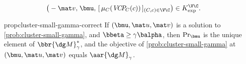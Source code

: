 {\begin{align*}
    \big(-\mat v,\;&\bmu,\, [\,\mu_{C}(\Pash_C(c))\,]_{(C,c)\in\V\C}\big) \in K_{\exp}^{\V\C}
    .
\end{align*}}

\begin{linked}{prop}{cluster-small-gamma-correct}
    If $(\bmu, \mat u, \mat v)$ is a solution to \eqref{prob:cluster-small-gamma},
    and $\bbeta \ge \gamma \balpha$, then
    $\Pr_{\bmu}$ is the unique element of $\bbr{\dg M}^*_\gamma$,
    and the objective of \eqref{prob:cluster-small-gamma} at $(\bmu, \mat u, \mat v)$ equals $\aar{\dg M}_\gamma$.
\end{linked}


